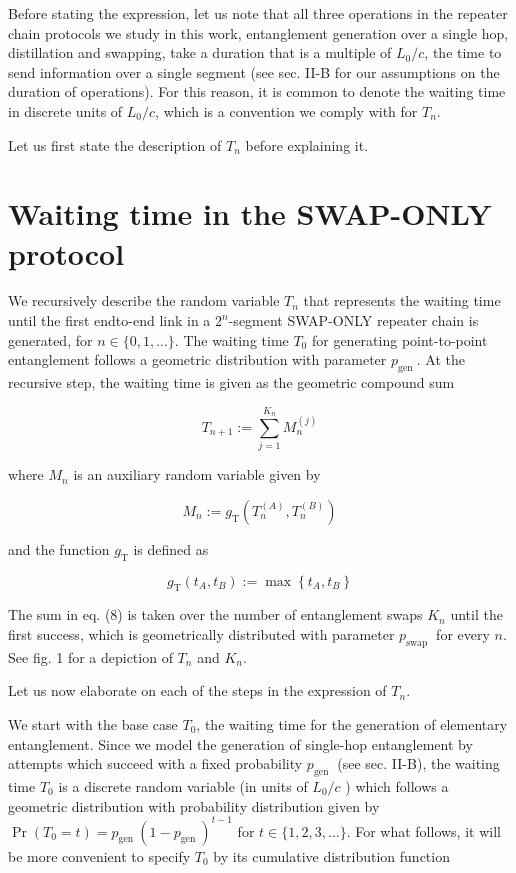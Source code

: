 \documentclass[10pt]{article}
\begin{document}
Before stating the expression, let us note that all three operations in the repeater chain protocols we study in this work, entanglement generation over a single hop, distillation and swapping, take a duration that is a multiple of $L_{0} / c$, the time to send information over a single segment (see sec. II-B for our assumptions on the duration of operations). For this reason, it is common to denote the waiting time in discrete units of $L_{0} / c$, which is a convention we comply with for $T_{n}$.

Let us first state the description of $T_{n}$ before explaining it.

\section*{Waiting time in the SWAP-ONLY protocol}
We recursively describe the random variable $T_{n}$ that represents the waiting time until the first endto-end link in a $2^{n}$-segment SWAP-ONLY repeater chain is generated, for $n \in\{0,1, \ldots\}$. The waiting time $T_{0}$ for generating point-to-point entanglement follows a geometric distribution with parameter $p_{\text {gen }}$. At the recursive step, the waiting time is given as the geometric compound sum


\begin{equation*}
T_{n+1}:=\sum_{j=1}^{K_{n}} M_{n}^{(j)} \tag{8}
\end{equation*}


where $M_{n}$ is an auxiliary random variable given by


\begin{equation*}
M_{n}:=g_{\mathrm{T}}\left(T_{n}^{(A)}, T_{n}^{(B)}\right) \tag{9}
\end{equation*}


and the function $g_{\mathrm{T}}$ is defined as


\begin{equation*}
g_{\mathrm{T}}\left(t_{A}, t_{B}\right):=\max \left\{t_{A}, t_{B}\right\} \tag{10}
\end{equation*}


The sum in eq. (8) is taken over the number of entanglement swaps $K_{n}$ until the first success, which is geometrically distributed with parameter $p_{\text {swap }}$ for every $n$. See fig. 1 for a depiction of $T_{n}$ and $K_{n}$.

Let us now elaborate on each of the steps in the expression of $T_{n}$.

We start with the base case $T_{0}$, the waiting time for the generation of elementary entanglement. Since we model the generation of single-hop entanglement by attempts which succeed with a fixed probability $p_{\text {gen }}$ (see sec. II-B), the waiting time $T_{0}$ is a discrete random variable (in units of $L_{0} / c$ ) which follows a geometric distribution with probability distribution given by $\operatorname{Pr}\left(T_{0}=t\right)=p_{\text {gen }}\left(1-p_{\text {gen }}\right)^{t-1}$ for $t \in\{1,2,3, \ldots\}$. For what follows, it will be more convenient to specify $T_{0}$ by its cumulative distribution function
\end{document}
